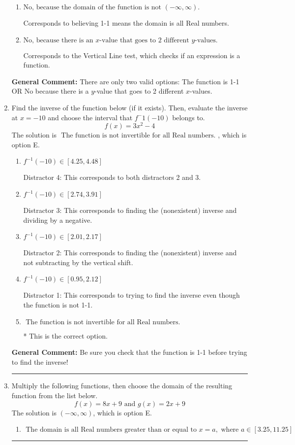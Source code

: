\documentclass{extbook}[14pt]
\newcommand{\litem}[1]{\item #1

\rule{\textwidth}{0.4pt}}
\begin{document}
\begin{enumerate}
{\begin{enumerate}[label=\Alph*.]
Corresponds to believing 1-1 means the range is all Real numbers.
\item \( \text{No, because the domain of the function is not $(-\infty, \infty)$.} \)

Corresponds to believing 1-1 means the domain is all Real numbers.
\item \( \text{No, because there is an $x$-value that goes to 2 different $y$-values.} \)

Corresponds to the Vertical Line test, which checks if an expression is a function.
\end{enumerate}

\textbf{General Comment:} There are only two valid options: The function is 1-1 OR No because there is a $y$-value that goes to 2 different $x$-values.
}
\litem{
Find the inverse of the function below (if it exists). Then, evaluate the inverse at $x = -10$ and choose the interval that $f^-1(-10)$ belongs to.
\[ f(x) = 3 x^2 - 4 \]The solution is \( \text{ The function is not invertible for all Real numbers. } \), which is option E.\begin{enumerate}[label=\Alph*.]
\item \( f^{-1}(-10) \in [4.25, 4.48] \)

 Distractor 4: This corresponds to both distractors 2 and 3.
\item \( f^{-1}(-10) \in [2.74, 3.91] \)

 Distractor 3: This corresponds to finding the (nonexistent) inverse and dividing by a negative.
\item \( f^{-1}(-10) \in [2.01, 2.17] \)

 Distractor 2: This corresponds to finding the (nonexistent) inverse and not subtracting by the vertical shift.
\item \( f^{-1}(-10) \in [0.95, 2.12] \)

 Distractor 1: This corresponds to trying to find the inverse even though the function is not 1-1. 
\item \( \text{ The function is not invertible for all Real numbers. } \)

* This is the correct option.
\end{enumerate}

\textbf{General Comment:} Be sure you check that the function is 1-1 before trying to find the inverse!
}
\litem{
Multiply the following functions, then choose the domain of the resulting function from the list below.
\[ f(x) = 8x + 9 \text{ and } g(x) = 2x + 9 \]The solution is \( (-\infty, \infty) \), which is option E.\begin{enumerate}[label=\Alph*.]
\item \( \text{ The domain is all Real numbers greater than or equal to } x = a, \text{ where } a \in [3.25, 11.25] \)



\end{enumerate}}
\end{enumerate}
\end{document}
